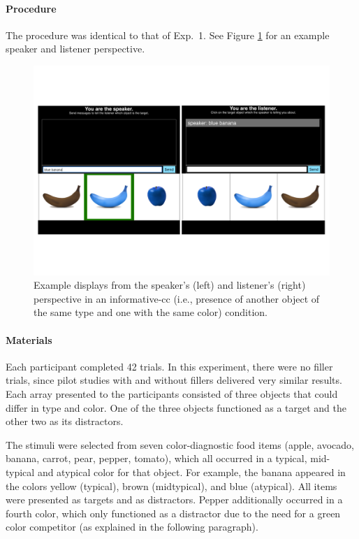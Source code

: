 \documentclass[11pt]{article}
\newcommand{\figref}[1]{Figure \ref{#1}}
\begin{document}
\paragraph{Procedure}

The procedure was identical to that of Exp.~1. See \figref{fig:mturk} for an example speaker and listener perspective.


\begin{figure}[bt!]
	\centering
	\includegraphics[width=1\textwidth]{pics/design_0}
	\caption{Example displays from the speaker's (left) and listener's (right) perspective in an informative-cc (i.e., presence of another object of the same type and one with the same color) condition.
	}
	\label{fig:mturk}
\end{figure}

\paragraph{Materials}

Each participant completed 42 trials. In this experiment, there were no filler trials, since pilot studies with and without fillers delivered very similar results. Each array presented to the participants consisted of three objects that could differ in type and color. One of the three objects functioned as a target and the other two as its distractors.

The stimuli were selected from seven color-diagnostic food items (apple, avocado, banana, carrot, pear, pepper, tomato), which all occurred in a typical, mid-typical and atypical color for that object. For example, the banana appeared in the colors yellow (typical), brown (midtypical), and blue (atypical). 
All items were presented as targets and as distractors. Pepper additionally occurred in a fourth color, which only functioned as a distractor due to the need for a green color competitor (as explained in the following paragraph). 
\end{document}
